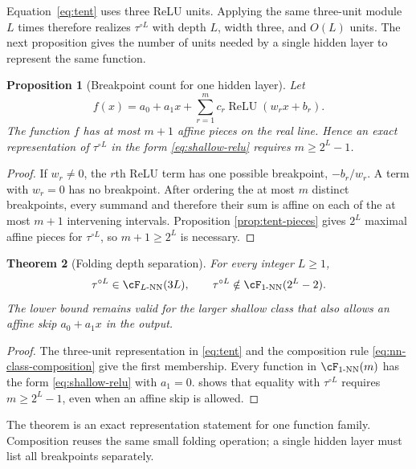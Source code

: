 \documentclass[11pt,twoside]{article}
\newcommand{\relu}{\operatorname{ReLU}}
\newtheorem{theorem}{Theorem}[section]
\newtheorem{proposition}[theorem]{Proposition}
\theoremstyle{definition}
\theoremstyle{remark}
\begin{document}
Equation~\eqref{eq:tent} uses three ReLU units. Applying the same three-unit
module $L$ times therefore realizes $\tau^{\circ L}$ with depth $L$, width
three, and $O(L)$ units. The next proposition gives the number of units needed
by a single hidden layer to represent the same function.

\begin{proposition}[Breakpoint count for one hidden layer]
\label{prop:shallow-pieces}
Let
\begin{equation}
 f(x)=a_0+a_1x+\sum_{r=1}^m c_r\relu(w_rx+b_r).
 \label{eq:shallow-relu}
\end{equation}
The function $f$ has at most $m+1$ affine pieces on the real line. Hence an
exact representation of $\tau^{\circ L}$ in the form
\eqref{eq:shallow-relu} requires $m\geq2^L-1$.
\end{proposition}

\begin{proof}
If $w_r\neq0$, the $r$th ReLU term has one possible breakpoint,
$-b_r/w_r$. A term with $w_r=0$ has no breakpoint. After ordering the at most
$m$ distinct breakpoints, every summand and therefore their sum is affine on
each of the at most $m+1$ intervening intervals. Proposition
\ref{prop:tent-pieces} gives $2^L$ maximal affine pieces for
$\tau^{\circ L}$, so $m+1\geq2^L$ is necessary.
\end{proof}

\begin{theorem}[Folding depth separation]
\label{thm:folding-depth-separation}
For every integer $L\geq1$,
\[
 \tau^{\circ L}\in\cF_{L\text{-NN}}(3L),
 \qquad
 \tau^{\circ L}\notin\cF_{1\text{-NN}}(2^L-2).
\]
The lower bound remains valid for the larger shallow class that also
allows an affine skip $a_0+a_1x$ in the output.
\end{theorem}

\begin{proof}
The three-unit representation in \cref{eq:tent} and the composition rule
\eqref{eq:nn-class-composition} give the first membership. Every function in
$\cF_{1\text{-NN}}(m)$ has the form \eqref{eq:shallow-relu} with $a_1=0$.
 shows that equality with $\tau^{\circ L}$ requires
$m\geq2^L-1$, even when an affine skip is allowed.
\end{proof}

The theorem is an exact representation statement for one function family.
Composition reuses the same small folding operation; a single hidden layer
must list all breakpoints separately.
\end{document}
